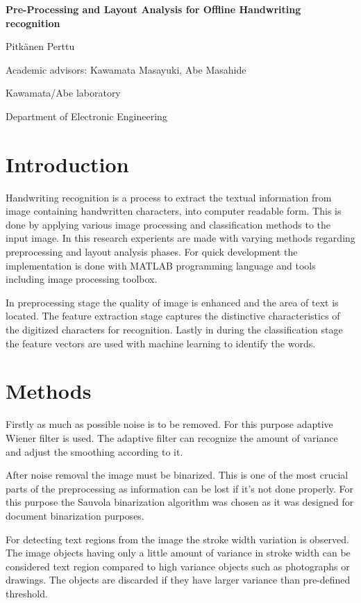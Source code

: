\documentclass{article}
\begin{document}
  \begin{multicols}{2}
    \begin{center}

    \large
    \textbf{Pre-Processing and Layout Analysis for Offline Handwriting recognition}

    \normalsize
      Pitk{\"a}nen Perttu

      Academic advisors: Kawamata Masayuki, Abe Masahide

      Kawamata/Abe laboratory

      Department of Electronic Engineering
      \end{center}

      \section*{Introduction}
        Handwriting recognition is a process to extract the textual information from image containing handwritten characters, into computer readable form. This is done by applying various image processing and classification methods to the input image. In this research experients are made with varying methods regarding preprocessing and layout analysis phases. For quick development the implementation is done with MATLAB programming language and tools including image processing toolbox.

      	In preprocessing stage the quality of image is enhanced and the area of text is located.  The feature extraction stage captures the distinctive characteristics of the digitized characters for recognition. Lastly in during the classification stage the feature vectors are used with machine learning to identify the  words.

      \section*{Methods}
        Firstly as much as possible noise is to be removed. For this purpose adaptive Wiener filter is used. The adaptive filter can recognize the amount of variance and adjust the smoothing according to it.

      	After noise removal the image must be binarized. This is one of the most crucial parts of the preprocessing as information can be lost if it's not done properly. For this purpose the Sauvola binarization algorithm was chosen as it was designed for document binarization purposes.

      	For detecting text regions from the image the stroke width variation is observed. The image objects having only a little amount of variance in stroke width can be considered text region compared to high variance objects such as photographs or drawings. The objects are discarded if they have larger variance than pre-defined threshold.


\end{multicols}
\end{document}
